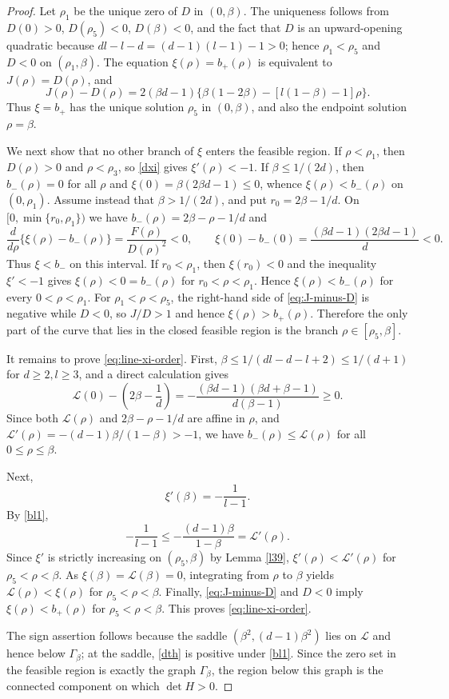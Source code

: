 \documentclass[11pt]{amsart}
\theoremstyle{plain}
\numberwithin{equation}{section}
\numberwithin{theorem}{section}
\numberwithin{figure}{section}
\begin{document}
\begin{proof}
Let $\rho_1$ be the unique zero of $D$ in $(0,\beta)$.  The uniqueness follows from
$D(0)>0$, $D(\rho_5)<0$, $D(\beta)<0$, and the fact that $D$ is an upward-opening
quadratic because $dl-l-d=(d-1)(l-1)-1>0$; hence $\rho_1<\rho_5$ and $D<0$ on $(\rho_1,\beta)$.  The equation
$\xi(\rho)=b_+(\rho)$ is equivalent to $J(\rho)=D(\rho)$, and
\begin{equation}
J(\rho)-D(\rho)=2(\beta d-1)
\{\beta(1-2\beta)-[l(1-\beta)-1]\rho\}.
\label{eq:J-minus-D}
\end{equation}
Thus $\xi=b_+$ has the unique solution $\rho_5$ in $(0,\beta)$, and also the endpoint
solution $\rho=\beta$.

We next show that no other branch of $\xi$ enters the feasible region.  If $\rho<\rho_1$,
then $D(\rho)>0$ and $\rho<\rho_3$, so \eqref{dxi} gives $\xi'(\rho)<-1$.  If
$\beta\leq1/(2d)$, then $b_-(\rho)=0$ for all $\rho$ and
$\xi(0)=\beta(2\beta d-1)\leq0$, whence $\xi(\rho)<b_-(\rho)$ on $(0,\rho_1)$.
Assume instead that $\beta>1/(2d)$, and put $r_0=2\beta-1/d$.  On
$[0,\min\{r_0,\rho_1\})$ we have $b_-(\rho)=2\beta-\rho-1/d$ and
\[
\frac{d}{d\rho}\{\xi(\rho)-b_-(\rho)\}=\frac{F(\rho)}{D(\rho)^2}<0,
\qquad
\xi(0)-b_-(0)=\frac{(\beta d-1)(2\beta d-1)}d<0.
\]
Thus $\xi<b_-$ on this interval.  If $r_0<\rho_1$, then $\xi(r_0)<0$ and the inequality
$\xi'<-1$ gives $\xi(\rho)<0=b_-(\rho)$ for $r_0<\rho<\rho_1$.  Hence
$\xi(\rho)<b_-(\rho)$ for every $0<\rho<\rho_1$.  For $\rho_1<\rho<\rho_5$, the
right-hand side of \eqref{eq:J-minus-D} is negative while $D<0$, so $J/D>1$ and hence
$\xi(\rho)>b_+(\rho)$.  Therefore the only part of the curve that lies in the closed
feasible region is the branch $\rho\in[\rho_5,\beta]$.

It remains to prove \eqref{eq:line-xi-order}.  First, $\beta\leq1/(dl-d-l+2)\leq1/(d+1)$
for $d\geq2,l\geq3$, and a direct calculation gives
\[
\mathcal L(0)-\left(2\beta-\frac1d\right)
=-\frac{(\beta d-1)(\beta d+\beta-1)}{d(\beta-1)}\geq0.
\]
Since both $\mathcal L(\rho)$ and $2\beta-\rho-1/d$ are affine in $\rho$, and
$\mathcal L'(\rho)=-{(d-1)\beta}/{(1-\beta)}>-1$, we have
$b_-(\rho)\leq\mathcal L(\rho)$ for all $0\leq\rho\leq\beta$.

Next,
\[
\xi'(\beta)=-\frac1{l-1}.
\]
By \eqref{bl1},
\[
-\frac1{l-1}\leq -\frac{(d-1)\beta}{1-\beta}=\mathcal L'(\rho).
\]
Since $\xi'$ is strictly increasing on $(\rho_5,\beta)$ by Lemma \ref{l39},
$\xi'(\rho)<\mathcal L'(\rho)$ for $\rho_5<\rho<\beta$.  As $\xi(\beta)=\mathcal L(\beta)=0$,
integrating from $\rho$ to $\beta$ yields $\mathcal L(\rho)<\xi(\rho)$ for
$\rho_5<\rho<\beta$.  Finally, \eqref{eq:J-minus-D} and $D<0$ imply
$\xi(\rho)<b_+(\rho)$ for $\rho_5<\rho<\beta$.  This proves \eqref{eq:line-xi-order}.

The sign assertion follows because the saddle
$(\beta^2,(d-1)\beta^2)$ lies on $\mathcal L$ and hence below $\Gamma_\beta$; at the
saddle, \eqref{dth} is positive under \eqref{bl1}.  Since the zero set in the feasible
region is exactly the graph $\Gamma_\beta$, the region below this graph is the connected
component on which $\det H>0$.
\end{proof}
\end{document}
